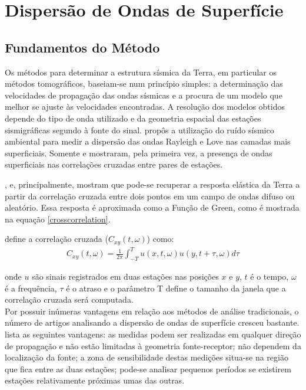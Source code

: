 \chapter{Dispersão de Ondas de Superfície}

\section{Fundamentos do Método}

Os métodos para determinar a estrutura sísmica da Terra, em particular os métodos tomográficos, baseiam-se num princípio simples: a determinação das velocidades de propagação das ondas sísmicas e a procura de um modelo que melhor se ajuste às velocidades encontradas. A resolução dos modelos obtidos depende do tipo de onda utilizado e da geometria espacial das estações sismigráficas segundo à fonte do sinal. \cite{aki_space_1957} propôs a utilização do ruído sísmico ambiental para medir a dispersão das ondas Rayleigh e Love nas camadas mais superficiais. Somente \cite{campillo_long-range_2003}  e \cite{shapiro_emergence_2004} mostraram, pela primeira vez, a  presença de ondas superficiais nas correlações cruzadas entre pares de estações.

\cite{campillo_long-range_2003}, \cite{shapiro_emergence_2004} e, principalmente, \cite{wapenaar_retrieving_2004} mostram que pode-se recuperar a resposta elástica da Terra a partir da correlação cruzada entre dois pontos em  um campo de ondas difuso ou aleatório. Essa resposta é aproximada como a Função de Green, como é mostrada na equação \ref{crosscorrelation}. 

\cite{boschi_measuring_2013} define a correlação cruzada ($C_{xy}(t,\omega)$) como: 
\begin{eqnarray}
\label{crosscorrelation}
C_{xy}(t,\omega) = \frac{1}{2\pi}\int_{-T}^{T}u(x,t,\omega)u(y,t+\tau,\omega) d\tau
\end{eqnarray}

onde $u$ são sinais registrados em duas estações nas posições $x$ e $y$, $t$ é o tempo, $\omega$ é a frequência, $\tau$ é o atraso e o parâmetro T define o tamanho da janela que a correlação cruzada será computada.
\\

Por possuir inúmeras vantagens em relação aos métodos de análise tradicionais, o número de artigos analisando a dispersão de ondas de superfície cresceu bastante. \cite{shapiro_emergence_2004} lista as seguintes vantagens: as medidas podem ser realizadas em qualquer direção de propagação e não estão limitadas à geometria fonte-receptor; não dependem da localização da fonte; a zona de sensibilidade destas medições situa-se na região que fica entre as duas estações; pode-se analisar pequenos períodos se existirem estações relativamente próximas umas das outras.

